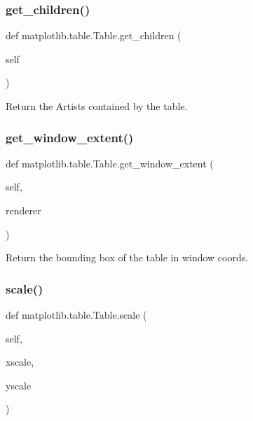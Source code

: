 \subsubsection{\texorpdfstring{get\+\_\+children()}{get\_children()}}
{\footnotesize\ttfamily def matplotlib.\+table.\+Table.\+get\+\_\+children (\begin{DoxyParamCaption}\item[{}]{self }\end{DoxyParamCaption})}

\begin{DoxyVerb}Return the Artists contained by the table.\end{DoxyVerb}
 \mbox{\label{classmatplotlib_1_1table_1_1Table_a09614514d4cb83db4c452c9ee48c06b1}} 
\subsubsection{\texorpdfstring{get\+\_\+window\+\_\+extent()}{get\_window\_extent()}}
{\footnotesize\ttfamily def matplotlib.\+table.\+Table.\+get\+\_\+window\+\_\+extent (\begin{DoxyParamCaption}\item[{}]{self,  }\item[{}]{renderer }\end{DoxyParamCaption})}

\begin{DoxyVerb}Return the bounding box of the table in window coords.\end{DoxyVerb}
 \mbox{\label{classmatplotlib_1_1table_1_1Table_accfb3c665905c34572540e1448fe3376}} 
\subsubsection{\texorpdfstring{scale()}{scale()}}
{\footnotesize\ttfamily def matplotlib.\+table.\+Table.\+scale (\begin{DoxyParamCaption}\item[{}]{self,  }\item[{}]{xscale,  }\item[{}]{yscale }\end{DoxyParamCaption})}

